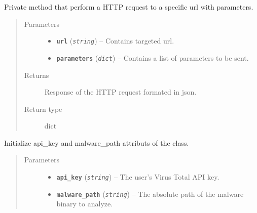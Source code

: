 \documentclass[letterpaper,10pt,oneside]{sphinxmanual}
\begin{document}
\begin{fulllineitems}
\begin{fulllineitems}
\end{fulllineitems}


\begin{fulllineitems}
\label{index:lib.vt.Vt._Vt__send_req}
Private method that perform a HTTP request to a specific url
with parameters.
\begin{quote}\begin{description}
\item[{Parameters}] \leavevmode\begin{itemize}
\item {} 
\textbf{\texttt{url}} (\emph{\texttt{string}}) -- Contains targeted url.

\item {} 
\textbf{\texttt{parameters}} (\emph{\texttt{dict}}) -- Contains a list of parameters to be sent.

\end{itemize}

\item[{Returns}] \leavevmode
Response of the HTTP request formated in json.

\item[{Return type}] \leavevmode
dict

\end{description}\end{quote}

\end{fulllineitems}


\begin{fulllineitems}
\label{index:lib.vt.Vt.__init__}
Initialize api\_key and malware\_path attributs of the class.
\begin{quote}\begin{description}
\item[{Parameters}] \leavevmode\begin{itemize}
\item {} 
\textbf{\texttt{api\_key}} (\emph{\texttt{string}}) -- The user's Virus Total API key.

\item {} 
\textbf{\texttt{malware\_path}} (\emph{\texttt{string}}) -- The absolute path of the malware binary to
analyze.


\end{itemize}
\end{description}
\end{quote}
\end{fulllineitems}
\end{fulllineitems}
\end{document}
